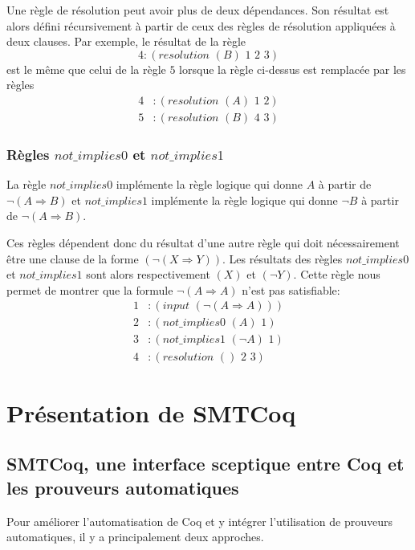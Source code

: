 \documentclass[11pt]{article}
\begin{document}
Une règle de résolution peut avoir plus de deux dépendances. Son résultat est alors défini récursivement à partir de ceux des règles de résolution appliquées à deux clauses. Par exemple, le résultat de la règle \[4:(resolution \,\,(B) \,\,1\,\, 2\,\,3) \]
est le même que celui de la règle $5$ lorsque la règle ci-dessus est remplacée par les règles
\begin{align*}
4&:(resolution \,\,(A) \,\,1\,\, 2) \\
5&:(resolution \,\,(B) \,\,4\,\, 3) 
\end{align*}

\subsubsection{Règles $not\_implies0$ et $not\_implies1$} \label{not_implies}
La règle $not\_implies0$ implémente la règle logique qui donne $A$ à partir de $\neg (A \Rightarrow B)$ et $not\_implies1$ implémente la règle logique qui donne $\neg B$ à partir de $\neg (A \Rightarrow B)$. \medbreak

Ces règles dépendent donc du résultat d'une autre règle qui doit nécessairement être une clause de la forme $(\neg (X \Rightarrow Y))$. Les résultats des règles $not\_implies0$ et $not\_implies1$ sont alors respectivement $(X)$ et $(\neg Y)$. Cette règle nous permet de montrer que la formule $\neg (A \Rightarrow A)$ n'est pas satisfiable:
\begin{align*}
  1&:(input\,\, (\neg ( A \Rightarrow A))) \\
  2&:(not\_implies0\,\, (A)\,\, 1) \\
  3&:(not\_implies1\,\, (\neg A) \,\,1) \\
  4&:(resolution\,\, ()\,\, 2\,\, 3)
\end{align*}


\section{Présentation de SMTCoq} \label{pres_smtcoq}

\subsection{SMTCoq, une interface sceptique entre Coq et les prouveurs automatiques}\label{sceptique_autarcique}

Pour améliorer l'automatisation de Coq et y intégrer l'utilisation de prouveurs automatiques, il y a principalement deux approches.
\end{document}
